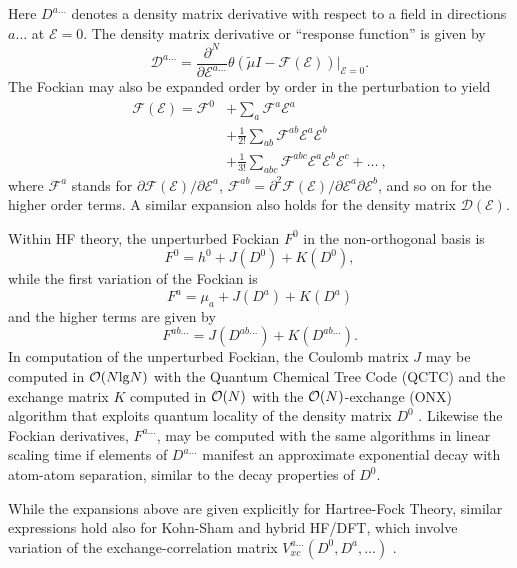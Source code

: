 \documentclass[prl,aps,preprint,showpacs,superbib]{revtex4}
\def\F{\mathcal{F}}
\def\D{\mathcal{D}}
\def\E{\mathcal{E}}
\begin{document}
Here $D^{a\ldots}$ denotes a density matrix derivative with respect to a field in directions $a\ldots$ 
at $\mathcal{E} = 0$.  The  density matrix derivative or ``response function'' is given by 
\begin{equation}
 \displaystyle\D^{a\ldots}=
 \frac{\partial^N}{\partial\E^{a\ldots}}\theta(\tilde{\mu}I-
 \F(\E))\bigg|_{\E=0} \label{DDeriv1}.
\end{equation}
 The Fockian may also be expanded order by order in the perturbation to yield
\begin{equation}\label{FockianTaylor}
  \begin{split}
    \F(\E)=\F^{0} & +\sum_a \F^{a}\E^{a}\\
    &+\frac{1}{2!}\sum_{ab} \F^{ab}\E^{a}\E^{b}\\
    &+\frac{1}{3!}\sum_{abc} \F^{abc}\E^{a}\E^{b}\E^{c}+\dots ~,
  \end{split}
\end{equation}
where $\F^{a}$ stands for $\partial\F(\E)/\partial\E^{a}$,
$\F^{ab}=\partial^2\F(\E)/\partial\E^{a}\partial\E^{b}$,
and so on for the higher order terms.
A similar expansion also holds for the density matrix $\D(\E)$.

Within HF theory, the unperturbed Fockian $F^0$ in the non-orthogonal basis is 
\begin{equation}
F^0=h^0+J(D^0)+K(D^0), \label{fockian0}
\end{equation}
while the first variation of the Fockian is 
\begin{equation}
F^a=\mu_a+J(D^a)+K(D^a)
\end{equation}
and the higher terms are given by 
\begin{equation}
F^{ab\ldots}=J(D^{ab\ldots})+K(D^{ab\ldots}). \label{fockianN}
\end{equation}
In computation of the unperturbed Fockian, the Coulomb matrix $J$ may be computed in ${\cal O}(N{\rm lg}N)$ 
with the Quantum Chemical Tree Code (QCTC) \cite{MChallacombe97} and the
exchange matrix $K$ computed in ${\cal O}(N)$ with the ${\cal O}(N)$-exchange  (ONX) algorithm 
that exploits quantum locality of the density matrix $D^0$ \cite{ESchwegler97}.
Likewise the Fockian derivatives, $F^{a\ldots}$, may be computed 
with the same algorithms in linear scaling time if elements of 
$D^{a\ldots}$ manifest an approximate exponential decay with atom-atom separation, 
similar to the decay properties of $D^0$. 

While the expansions above are given explicitly for Hartree-Fock Theory, similar expressions 
hold also for Kohn-Sham and hybrid HF/DFT,  which involve variation of the  exchange-correlation 
matrix $V_{xc}^{a\ldots}(D^0,D^a,\ldots)$ \cite{Lee_1994,PSalek02}.
\end{document}
